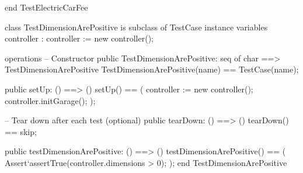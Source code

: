 \documentclass[a4paper]{article}
\begin{document}
\begin{vdm_al}
end TestElectricCarFee

class TestDimensionArePositive is subclass of TestCase
instance variables
    controller : controller := new controller();

operations
    -- Constructor
    public TestDimensionArePositive: seq of char ==> TestDimensionArePositive
    TestDimensionArePositive(name) == TestCase(name);

    public setUp: () ==> ()
    setUp() == 
    (
        controller := new controller();
        controller.initGarage();
    );

    -- Tear down after each test (optional)
    public tearDown: () ==> ()
    tearDown() == skip;

    public testDimensionArePositive: () ==> ()
    testDimensionArePositive() ==
    (
        Assert`assertTrue(controller.dimensions > 0);
    );
end TestDimensionArePositive 
\end{vdm_al}
\end{document}
